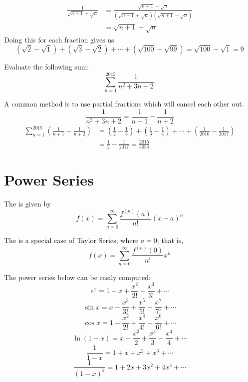 \begin{solution}
\begin{align*} \frac{1}{\sqrt{n+1}+\sqrt{n}} &= \frac{\sqrt{n+1}-\sqrt{n}}{(\sqrt{n+1}+\sqrt{n})(\sqrt{n+1}-\sqrt{n})} \\&= \sqrt{n+1}-\sqrt{n} \end{align*}
Doing this for each fraction gives us \[ (\sqrt{2}-\sqrt{1})+(\sqrt{3}-\sqrt{2})+\cdots+(\sqrt{100}-\sqrt{99})=\sqrt{100}-\sqrt{1}=9 \]
\end{solution}

\begin{exercise} 
Evaluate the following sum:
\[ \sum_{n=1}^{2015} \frac{1}{n^2+3n+2}. \] 
\end{exercise}

\begin{solution}
A common method is to use partial fractions which will cancel each other out.
\[ \frac{1}{n^2+3n+2}=\frac{1}{n+1}-\frac{1}{n+2} \]
\begin{align*}
\sum_{n=1}^{2015} \left( \frac{1}{n+1}-\frac{1}{n+2} \right)
&= \left(\frac{1}{2}-\frac{1}{3}\right)+\left(\frac{1}{3}-\frac{1}{4}\right)+\cdots+\left(\frac{1}{2016}-\frac{1}{2017}\right) \\
&= \frac{1}{2}-\frac{1}{2017}=\frac{2015}{4034}
\end{align*}
\end{solution}

\section{Power Series}
The  is given by 
\begin{equation}
f(x)=\sum_{n=0}^{\infty} \frac{f^{(n)}(a)}{n!} (x-a)^n
\end{equation} 

The  is a special case of Taylor Series, where $a=0$; that is, 
\begin{equation}
f(x)=\sum_{n=0}^{\infty} \frac{f^{(n)}(0)}{n!} x^n
\end{equation}

The power series below can be easily computed:
\begin{equation} e^x=1+x+\frac{x^2}{2!}+\frac{x^3}{3!}+\cdots \end{equation}
\begin{equation} \sin x=x - \frac{x^3}{3!}+\frac{x^5}{5!} - \frac{x^7}{7!}+\cdots \end{equation}
\begin{equation} \cos x=1 - \frac{x^2}{2!}+\frac{x^4}{4!} - \frac{x^6}{6!}+\cdots \end{equation}
\begin{equation} \ln (1+x)=x - \frac{x^2}{2}+\frac{x^3}{3} - \frac{x^4}{4}+\cdots \end{equation}
\begin{equation} \frac{1}{1-x}=1+x+x^2+x^3+\cdots \end{equation}
\begin{equation} \frac{1}{(1-x)^2}=1+2x+3x^2+4x^3+\cdots \end{equation}

